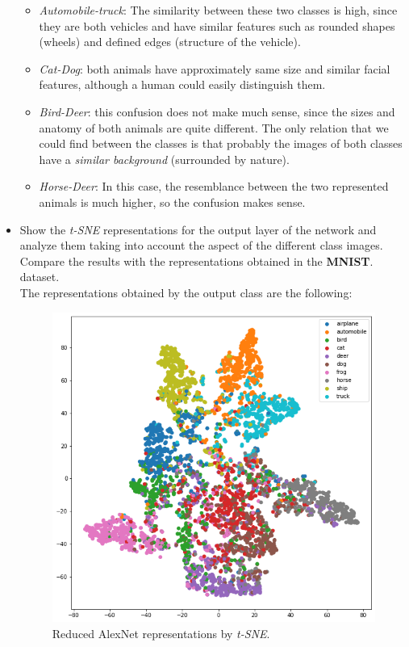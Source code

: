 \documentclass[a4paper]{article}
\begin{document}
\begin{itemize}
        \begin{itemize}
          \item \emph{Automobile-truck}: The similarity between these two classes is high, since they are both vehicles and have similar features such as rounded shapes (wheels) and defined edges (structure of the vehicle).
          \item \emph{Cat-Dog}: both animals have approximately same size and similar facial features, although a human could easily distinguish them.
          \item \emph{Bird-Deer}: this confusion does not make much sense, since the sizes and anatomy of both animals are quite different. The only relation that we could find between the classes is that probably the images of both classes have a \emph{similar background} (surrounded by nature).
          \item \emph{Horse-Deer}: In this case, the resemblance between the two represented animals is much higher, so the confusion makes sense.
        \end{itemize}
  \item Show the \emph{t-SNE} representations for the output layer of the network and analyze them taking into account the aspect of the different class images. Compare the results with the representations obtained in the \textbf{MNIST}.\\ dataset.\\

        The representations obtained by the output class are the following:
        \begin{figure}[H]
          \centering
          \includegraphics[scale = 0.5]{Figures/AlexNet-tSNE.png}
          \caption{Reduced AlexNet representations by \emph{t-SNE}.}
        \end{figure}


\end{itemize}
\end{document}
